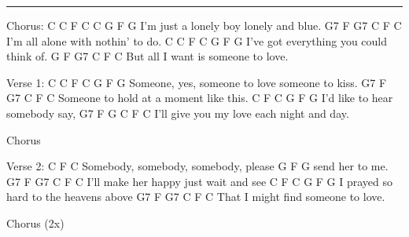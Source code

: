 \noindent\rule{\columnwidth}{1pt}

\begin{lstsong}
Chorus:
C          C          F C C          G   F G
I'm just a lonely boy     lonely and blue.
         G7   F G7                C  F C
I'm all alone     with nothin' to do.
C             C     F C                 G  F G
I've got everything     you could think of.
          G   F G7              C   F C
But all I want    is someone to love.

Verse 1:
C                        C    F C            G   F G
Someone, yes, someone to love     someone to kiss.
           G7   F G7                 C    F C
Someone to hold     at a moment like this.
C                F C           G  F G
I'd like to hear      somebody say,
G7                    F G                C  F C
I'll give you my love     each night and day.

Chorus

Verse 2:
C                                    F C
Somebody, somebody, somebody, please
            G  F G
send her to me.
G7                 F G7               C  F C
I'll make her happy     just wait and see
C                F C                 G    F G
I prayed so hard     to the heavens above
G7               F G7            C    F C
That I might find     someone to love.

Chorus (2x)
\end{lstsong}
\newpage

